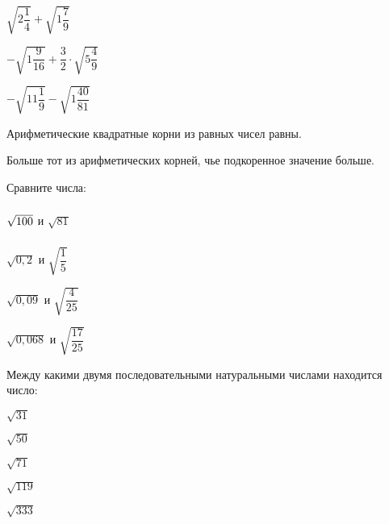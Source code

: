 \begin{class}[number=2]
\begin{listofex}
		\begin{enumcols}[itemcolumns=3]
			\item \( \sqrt{2\dfrac{1}{4}}+\sqrt{1\dfrac{7}{9}} \)
			\item \( -\sqrt{1\dfrac{9}{16}}+\dfrac{3}{2}\cdot\sqrt{5\dfrac{4}{9}} \)
			\item \( -\sqrt{11\dfrac{1}{9}}-\sqrt{1\dfrac{40}{81}} \)
		\end{enumcols}
	\end{listofex}
	\begin{definit}
		Арифметические квадратные корни из равных чисел равны.
	\end{definit}
	\begin{definit}
		Больше тот из арифметических корней, чье подкоренное значение больше.
	\end{definit}
	\begin{listofex}[resume]
		\item Сравните числа:
		\begin{enumcols}[itemcolumns=4]
			\item \( \vphantom{\sqrt{\dfrac{1}{5}}}\sqrt{100} \) и \( \sqrt{81} \)
			\item \( \sqrt{0,2} \) и \( \sqrt{\dfrac{1}{5}} \)
			\item \( \sqrt{0,09} \) и \( \sqrt{\dfrac{4}{25}} \)
			\item \( \sqrt{0,068} \) и \( \sqrt{\dfrac{17}{25}} \)
		\end{enumcols}
		\item Между какими двумя последовательными натуральными числами находится число:
		\begin{enumcols}[itemcolumns=5]
			\item \( \sqrt{31} \)
			\item \( \sqrt{50} \)
			\item \( \sqrt{71} \)
			\item \( \sqrt{119} \)
			\item \( \sqrt{333} \)
		\end{enumcols}
	\end{listofex}
	\begin{definit}

\end{definit}
\end{class}
